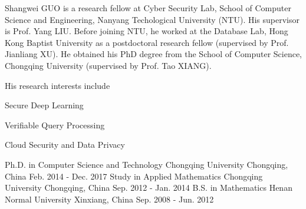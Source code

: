 \documentclass[11pt, a4paper]{awesome-cv}
\begin{document}
\makecvheader%



\begin{cvparagraph}
	Shangwei GUO is a research fellow at Cyber Security Lab, School of Computer Science and Engineering, Nanyang Techological University (NTU). His supervisor is Prof. Yang LIU. Before joining NTU, he worked at the Database Lab, Hong Kong Baptist University as a postdoctoral research fellow (supervised by Prof. Jianliang XU). He obtained his PhD degree from the School of Computer Science, Chongqing University (supervised by Prof. Tao XIANG). 
	
	\indent His research interests include
	\vspace{0.2cm}
	{
		\begin{cvitems}
			\item{Secure Deep Learning}
			\item{Verifiable Query Processing}
			\item{Cloud Security and Data Privacy}
		\end{cvitems}
	}
\end{cvparagraph}

\begin{cventries}
    \cventry%
    {Ph.D. in Computer Science and Technology}
    {Chongqing University}
    {Chongqing, China}
    {Feb. 2014 - Dec. 2017} %
    {}
    \vspace{-0.3cm}
	\cventry%
	{Study in Applied Mathematics}
	{Chongqing University}
	{Chongqing, China}
	{Sep. 2012 - Jan. 2014} %
	{}
	\vspace{-0.3cm}
    \cventry%
    {B.S. in Mathematics}
    {Henan Normal University}
    {Xinxiang, China}
    {Sep. 2008 - Jun. 2012} %
    {}
    \vspace{-0.3cm}
\end{cventries}
\end{document}
